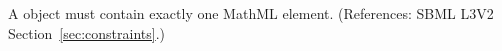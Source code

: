 A \Constraint object must contain exactly one MathML  element.
(References: SBML L3V2 Section~\ref{sec:constraints}.)
